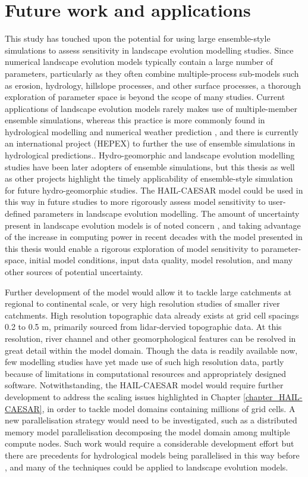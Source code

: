 \section{Future work and applications}
This study has touched upon the potential for using large ensemble-style simulations to assess sensitivity in landscape evolution modelling studies. Since numerical landscape evolution models typically contain a large number of parameters, particularly as they often combine multiple-process sub-models such as erosion, hydrology, hillslope processes, and other surface processes, a thorough exploration of parameter space is beyond the scope of many studies. Current applications of landscape evolution models rarely makes use of multiple-member ensemble simulations, whereas this practice is more commonly found in hydrological modelling \citep{cloke2009ensemble,wong2015sensitivity} and numerical weather prediction \citep{sivillo1997ensemble}, and there is currently an international project (HEPEX) to further the use of ensemble simulations in hydrological predictions.\citep{schaake2007hepex}. Hydro-geomorphic and landscape evolution modelling studies have been later adopters of ensemble simulations, but this thesis as well as other projects \citep[e.g][]{skinner2017lemsi} highlight the timely applicability of ensemble-style simulation for future hydro-geomorphic studies. The HAIL-CAESAR model could be used in this way in future studies to more rigorously assess model sensitivity to user-defined parameters in landscape evolution modelling. The amount of uncertainty present in landscape evolution models is of noted concern \citep{pelletier2015forecasting}, and taking advantage of the increase in computing power in recent decades with the model presented in this thesis would enable a rigorous exploration of model sensitivity to parameter-space, initial model conditions, input data quality, model resolution, and many other sources of potential uncertainty.

Further development of the model would allow it to tackle large catchments at regional to continental scale, or very high resolution studies of smaller river catchments. High resolution topographic data already exists at grid cell spacings 0.2 to 0.5 m, primarily sourced from lidar-dervied topographic data. At this resolution, river channel and other geomorphological features can be resolved in great detail within the model domain. Though the data is readily available now, few modelling studies have yet made use of such high resolution data, partly because of limitations in computational resources and appropriately designed software. Notwithstanding, the HAIL-CAESAR model would require further development to address the scaling issues highlighted in Chapter \ref{chapter_HAIL-CAESAR}, in order to tackle model domains containing millions of grid cells. A new parallelisation strategy would need to be investigated, such as a distributed memory model parallelisation decomposing the model domain among multiple compute nodes. Such work would require a considerable development effort but there are precedents for hydrological models being parallelised in this way before \citep{vivoni2011real}, and many of the techniques could be applied to landscape evolution models.
 
